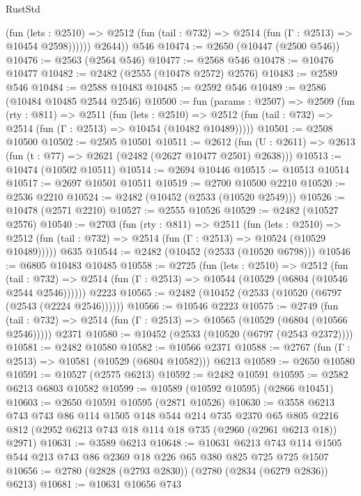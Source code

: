 \begin{lexlean}{RustStd}
\begin{coremodule}
              (fun (lets : @2510) =>
              @2512 (fun (tail : @732) => @2514 (fun (Γ : @2513) => @10454 @2598))))))
        @2644))
    @546
@10474 := @2650 (@10447 (@2500 @546))
@10476 := @2563 (@2564 @546)
@10477 := @2568 @546
@10478 := @10476 @10477
@10482 := @2482 (@2555 (@10478 @2572) @2576)
@10483 := @2589 @546
@10484 := @2588 @10483
@10485 := @2592 @546
@10489 := @2586 (@10484 @10485 @2544 @2546)
@10500 := fun (params : @2507) =>
  @2509
    (fun (rty : @811) =>
    @2511
      (fun (lets : @2510) =>
      @2512 (fun (tail : @732) => @2514 (fun (Γ : @2513) => @10454 (@10482 @10489)))))
@10501 := @2508 @10500
@10502 := @2505 @10501
@10511 := @2612
    (fun (U : @2611) => @2613 (fun (t : @77) => @2621 (@2482 (@2627 @10477 @2501) @2638)))
@10513 := @10474 (@10502 @10511)
@10514 := @2694 @10446
@10515 := @10513 @10514
@10517 := @2697 @10501 @10511
@10519 := @2700 @10500 @2210
@10520 := @2536 @2210
@10524 := @2482 (@10452 (@2533 (@10520 @2549)))
@10526 := @10478 (@2571 @2210)
@10527 := @2555 @10526
@10529 := @2482 (@10527 @2576)
@10540 := @2703
    (fun (rty : @811) =>
    @2511
      (fun (lets : @2510) =>
      @2512 (fun (tail : @732) => @2514 (fun (Γ : @2513) => @10524 (@10529 @10489)))))
    @635
@10544 := @2482 (@10452 (@2533 (@10520 @6798)))
@10546 := @6805 @10483 @10485
@10558 := @2725
    (fun (lets : @2510) =>
    @2512
      (fun (tail : @732) =>
      @2514 (fun (Γ : @2513) => @10544 (@10529 (@6804 (@10546 @2544 @2546))))))
    @2223
@10565 := @2482 (@10452 (@2533 (@10520 (@6797 (@2543 (@2224 @2546))))))
@10566 := @10546 @2223
@10575 := @2749
    (fun (tail : @732) => @2514 (fun (Γ : @2513) => @10565 (@10529 (@6804 (@10566 @2546)))))
    @2371
@10580 := @10452 (@2533 (@10520 (@6797 (@2543 @2372))))
@10581 := @2482 @10580
@10582 := @10566 @2371
@10588 := @2767 (fun (Γ : @2513) => @10581 (@10529 (@6804 @10582))) @6213
@10589 := @2650 @10580
@10591 := @10527 (@2575 @6213)
@10592 := @2482 @10591
@10595 := @2582 @6213 @6803 @10582
@10599 := @10589 (@10592 @10595) (@2866 @10451)
@10603 := @2650 @10591 @10595 (@2871 @10526)
@10630 := @3558
    @6213
    @743
    @743
    @86
    @114
    @1505
    @148
    @544
    @214
    @735
    @2370
    @65
    @805
    @2216
    @812
    (@2952 @6213 @743 @18 @114 @18 @735 (@2960 (@2961 @6213 @18)) @2971)
@10631 := @3589 @6213
@10648 := @10631
    @6213
    @743
    @114
    @1505
    @544
    @213
    @743
    @86
    @2369
    @18
    @226
    @65
    @380
    @825
    @725
    @725
    @1507
@10656 := @2780 (@2828 (@2793 @2830)) (@2780 (@2834 (@6279 @2836)) @6213)
@10681 := @10631
    @10656
    @743

\end{coremodule}
\end{lexlean}
